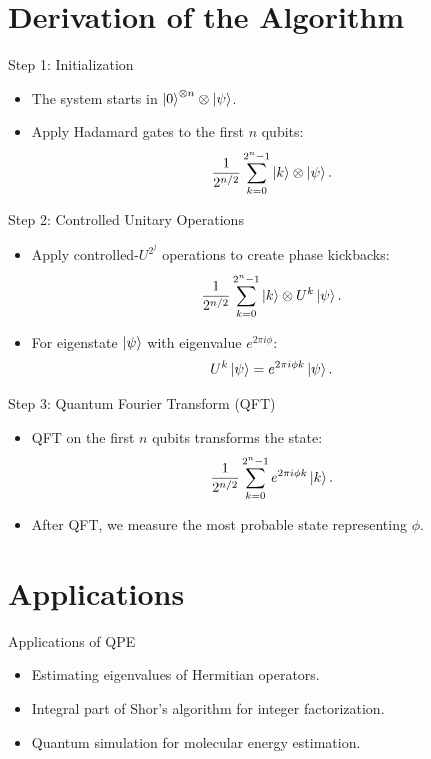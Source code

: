 \documentclass{beamer}
\begin{document}
\section{Derivation of the Algorithm}
\begin{frame}{Step 1: Initialization}
    \begin{itemize}
        \item The system starts in $\ket{0}^{\otimes n} \otimes \ket{\psi}$.
        \item Apply Hadamard gates to the first $n$ qubits:
        \[ \frac{1}{2^{n/2}} \sum_{k=0}^{2^n -1} \ket{k} \otimes \ket{\psi}. \]
    \end{itemize}
\end{frame}

\begin{frame}{Step 2: Controlled Unitary Operations}
    \begin{itemize}
        \item Apply controlled-$U^{2^j}$ operations to create phase kickbacks:
        \[ \frac{1}{2^{n/2}} \sum_{k=0}^{2^n -1} \ket{k} \otimes U^k\ket{\psi}. \]
        \item For eigenstate $\ket{\psi}$ with eigenvalue $e^{2\pi i \phi}$:
        \[ U^k\ket{\psi} = e^{2\pi i \phi k} \ket{\psi}. \]
    \end{itemize}
\end{frame}

\begin{frame}{Step 3: Quantum Fourier Transform (QFT)}
    \begin{itemize}
        \item QFT on the first $n$ qubits transforms the state:
        \[ \frac{1}{2^{n/2}} \sum_{k=0}^{2^n -1} e^{2\pi i \phi k} \ket{k}. \]
        \item After QFT, we measure the most probable state representing $\phi$.
    \end{itemize}
\end{frame}

\section{Applications}
\begin{frame}{Applications of QPE}
    \begin{itemize}
        \item Estimating eigenvalues of Hermitian operators.
        \item Integral part of Shor's algorithm for integer factorization.
        \item Quantum simulation for molecular energy estimation.
    \end{itemize}
\end{frame}
\end{document}
